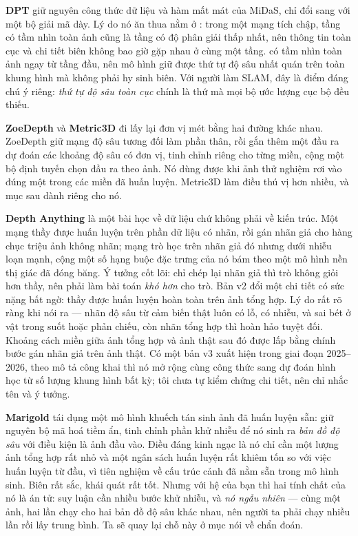\documentclass[../../deep_learning.tex]{subfiles}
\begin{document}
\textbf{DPT} \cite{ranftl2021dpt} giữ nguyên công thức dữ liệu và hàm mất mát của MiDaS, chỉ đổi  sang  với một bộ giải mã dày. Lý do nó ăn thua nằm ở : trong một mạng tích chập, tầng có tầm nhìn toàn ảnh cũng là tầng có độ phân giải thấp nhất, nên thông tin toàn cục và chi tiết biên không bao giờ gặp nhau ở cùng một tầng.  có tầm nhìn toàn ảnh ngay từ tầng đầu, nên mô hình giữ được thứ tự độ sâu nhất quán trên toàn khung hình mà không phải hy sinh biên. Với người làm SLAM, đây là điểm đáng chú ý riêng: \emph{thứ tự độ sâu toàn cục} chính là thứ mà mọi bộ ước lượng cục bộ đều thiếu.

\textbf{ZoeDepth} \cite{bhat2023zoedepth} và \textbf{Metric3D} \cite{yin2023metric3d} đi lấy lại đơn vị mét bằng hai đường khác nhau. ZoeDepth giữ mạng độ sâu tương đối làm phần thân, rồi gắn thêm một đầu ra dự đoán các khoảng độ sâu có đơn vị, tinh chỉnh riêng cho từng miền, cộng một bộ định tuyến chọn đầu ra theo ảnh. Nó dùng được khi ảnh thử nghiệm rơi vào đúng một trong các miền đã huấn luyện. Metric3D làm điều thú vị hơn nhiều, và mục sau dành riêng cho nó.

\textbf{Depth Anything} \cite{yang2024depthanything} là một bài học về dữ liệu chứ không phải về kiến trúc. Một mạng thầy được huấn luyện trên phần dữ liệu có nhãn, rồi gán nhãn giả cho hàng chục triệu ảnh không nhãn; mạng trò học trên nhãn giả đó nhưng dưới nhiễu loạn mạnh, cộng một số hạng buộc đặc trưng của nó bám theo một mô hình nền thị giác đã đóng băng. Ý tưởng cốt lõi: chỉ chép lại nhãn giả thì trò không giỏi hơn thầy, nên phải làm bài toán \emph{khó hơn} cho trò. Bản v2 \cite{yang2024depthanythingv2} đổi một chi tiết có sức nặng bất ngờ: thầy được huấn luyện hoàn toàn trên ảnh tổng hợp. Lý do rất rõ ràng khi nói ra --- nhãn độ sâu từ cảm biến thật luôn có lỗ, có nhiễu, và sai bét ở vật trong suốt hoặc phản chiếu, còn nhãn tổng hợp thì hoàn hảo tuyệt đối. Khoảng cách miền giữa ảnh tổng hợp và ảnh thật sau đó được lấp bằng chính bước gán nhãn giả trên ảnh thật. Có một bản v3 xuất hiện trong giai đoạn 2025--2026, theo mô tả công khai thì nó mở rộng cùng công thức sang dự đoán hình học từ số lượng khung hình bất kỳ; tôi chưa tự kiểm chứng chi tiết, nên chỉ nhắc tên và ý tưởng.

\textbf{Marigold} \cite{ke2024marigold} tái dụng một mô hình khuếch tán sinh ảnh đã huấn luyện sẵn: giữ nguyên bộ mã hoá tiềm ẩn, tinh chỉnh phần khử nhiễu để nó sinh ra \emph{bản đồ độ sâu} với điều kiện là ảnh đầu vào. Điều đáng kinh ngạc là nó chỉ cần một lượng ảnh tổng hợp rất nhỏ và một ngân sách huấn luyện rất khiêm tốn so với việc huấn luyện từ đầu, vì tiên nghiệm về cấu trúc cảnh đã nằm sẵn trong mô hình sinh. Biên rất sắc, khái quát rất tốt. Nhưng với hệ của bạn thì hai tính chất của nó là án tử: suy luận cần nhiều bước khử nhiễu, và \emph{nó ngẫu nhiên} --- cùng một ảnh, hai lần chạy cho hai bản đồ độ sâu khác nhau, nên người ta phải chạy nhiều lần rồi lấy trung bình. Ta sẽ quay lại chỗ này ở mục nói về chẩn đoán.
\end{document}
